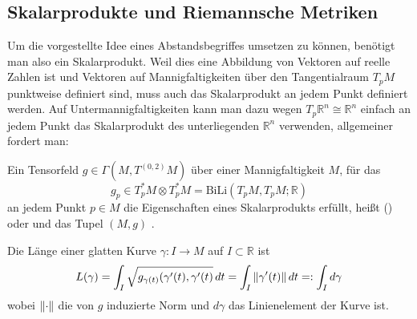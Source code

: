 		\subsection{Skalarprodukte und Riemannsche Metriken}%
Um die vorgestellte Idee eines Abstandsbegriffes umsetzen zu können, benötigt man also ein Skalarprodukt. Weil dies eine Abbildung von Vektoren auf reelle Zahlen ist und Vektoren auf Mannigfaltigkeiten über den Tangentialraum $T_p M$ punktweise definiert sind, muss auch das Skalarprodukt an jedem Punkt definiert werden. Auf Untermannigfaltigkeiten kann man dazu wegen $T_p \mathbb{R}^n \cong \mathbb{R}^n$ einfach an jedem Punkt das Skalarprodukt des unterliegenden $\mathbb{R}^n$ verwenden, allgemeiner fordert man:
\begin{defi}
Ein Tensorfeld $g \in \Gamma(M, T^{(0, 2)} M)$ über einer Mannigfaltigkeit $M$, für das
\begin{equation}
g_p \in T_p^* M \otimes T_p^* M = \text{BiLi}(T_p M, T_p M; \mathbb{R})
\end{equation}
an jedem Punkt $p \in M$ die Eigenschaften eines Skalarprodukts erfüllt, heißt  () oder  und das Tupel $(M, g)$ .


Die Länge einer glatten Kurve $\gamma: I \rightarrow M$ auf $I \subset \mathbb{R}$ ist
\begin{equation}
L(\gamma) = \int_I \sqrt{g_{\gamma(t)}(\gamma'(t), \gamma'(t)} \, dt = \int_I \norm{\gamma'(t)} \, dt =: \int_I d\gamma
\end{equation}
wobei $\norm{\cdot}$ die von $g$ induzierte Norm und $d\gamma$ das Linienelement der Kurve ist.
\end{defi}



